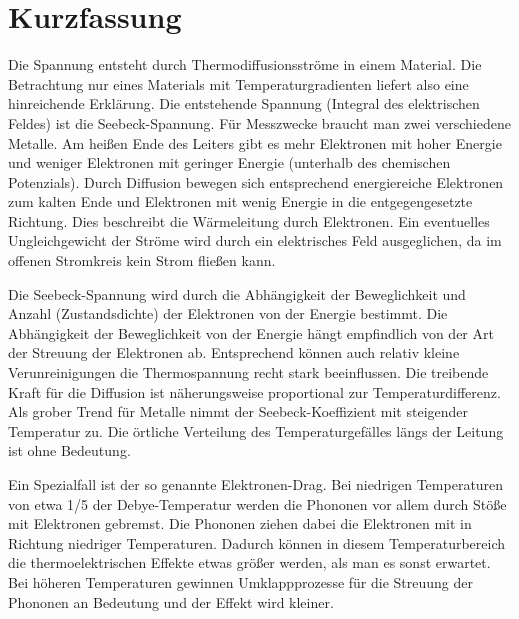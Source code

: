 \chapter*{Kurzfassung} %

Die Spannung entsteht durch Thermodiffusionsströme in einem Material. Die Betrachtung nur eines Materials mit Temperaturgradienten liefert also eine hinreichende Erklärung. Die entstehende Spannung (Integral des elektrischen Feldes) ist die Seebeck-Spannung. Für Messzwecke braucht man zwei verschiedene Metalle. Am heißen Ende des Leiters gibt es mehr Elektronen mit hoher Energie und weniger Elektronen mit geringer Energie (unterhalb des chemischen Potenzials). Durch Diffusion bewegen sich entsprechend energiereiche Elektronen zum kalten Ende und Elektronen mit wenig Energie in die entgegengesetzte Richtung. Dies beschreibt die Wärmeleitung durch Elektronen. Ein eventuelles Ungleichgewicht der Ströme wird durch ein elektrisches Feld ausgeglichen, da im offenen Stromkreis kein Strom fließen kann.

Die Seebeck-Spannung wird durch die Abhängigkeit der Beweglichkeit und Anzahl (Zustandsdichte) der Elektronen von der Energie bestimmt. Die Abhängigkeit der Beweglichkeit von der Energie hängt empfindlich von der Art der Streuung der Elektronen ab. Entsprechend können auch relativ kleine Verunreinigungen die Thermospannung recht stark beeinflussen. Die treibende Kraft für die Diffusion ist näherungsweise proportional zur Temperaturdifferenz. Als grober Trend für Metalle nimmt der Seebeck-Koeffizient mit steigender Temperatur zu. Die örtliche Verteilung des Temperaturgefälles längs der Leitung ist ohne Bedeutung.

Ein Spezialfall ist der so genannte Elektronen-Drag. Bei niedrigen Temperaturen von etwa 1/5 der Debye-Temperatur werden die Phononen vor allem durch Stöße mit Elektronen gebremst. Die Phononen ziehen dabei die Elektronen mit in Richtung niedriger Temperaturen. Dadurch können in diesem Temperaturbereich die thermoelektrischen Effekte etwas größer werden, als man es sonst erwartet. Bei höheren Temperaturen gewinnen Umklappprozesse für die Streuung der Phononen an Bedeutung und der Effekt wird kleiner.
\cleardoublepage
